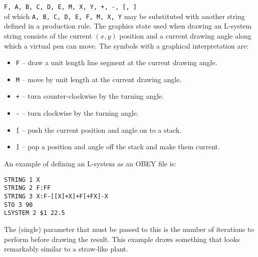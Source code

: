 \documentclass[a4paper,twoside,11pt]{article}
\newcommand{\newpara}{\par\vspace{4mm}\noindent}
\begin{document}
\texttt{F, A, B, C, D, E, M, X, Y, +, -, [, ]}\\
of which \texttt{A, B, C, D, E, F, M, X, Y} may be substituted with another string defined in a production rule.
The graphics state used when drawing an L-system string consists of the current $(x,y)$ position and a current
drawing angle along which a virtual pen can move. The symbols with a graphical interpretation are:
\begin{itemize}
\item \texttt{F} -- draw a unit length line segment at the current drawing angle.
\item \texttt{M} -- move by unit length at the current drawing angle.
\item \texttt{+} -- turn counter-clockwise by the turning angle.
\item \texttt{-} -- turn clockwise by the turning angle.
\item \texttt{[} -- push the current position and angle on to a stack.
\item \texttt{]} -- pop a position and angle off the stack and make them current.
\end{itemize}
\newpara
An example of defining an L-system as an OBEY file is:
\begin{verbatim}
STRING 1 X
STRING 2 F:FF
STRING 3 X:F-[[X]+X]+F[+FX]-X 
STO 3 90
LSYSTEM 2 $1 22.5
\end{verbatim}
The (single) parameter that must be passed to this is the number of iterations to perform
before drawing the result. This example draws something that looks remarkably similar to
a straw-like plant.
\end{document}
